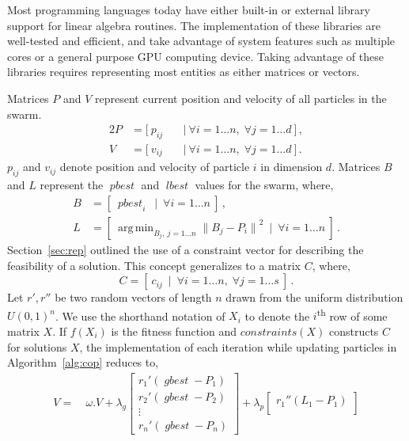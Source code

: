 \documentclass[10pt,draft]{article}
\newcommand{\tsup}{\textsuperscript}
\DeclareMathOperator*{\argmin}{arg\,min}
\DeclareMathOperator*{\pbest}{\mathit{pbest}}
\DeclareMathOperator*{\gbest}{\mathit{gbest}}
\DeclareMathOperator*{\lbest}{\mathit{lbest}}
\begin{document}
\begin{appendices}
  Most programming languages today have either built-in or external library support for linear algebra routines. The
  implementation of these libraries are well-tested and efficient, and take advantage of system features such as
  multiple cores or a general purpose GPU computing device. Taking advantage of these libraries requires representing
  most entities as either matrices or vectors. 

  Matrices $P$ and $V$ represent current position and velocity of all particles in the swarm.
  \begin{alignat}{2}
    P &= [\ p_{ij}\ &&\mid\ \forall i=1\dots n,\;\forall j=1\dots d\ ]\,,\\
    V &= [\ v_{ij}\ &&\mid\ \forall i=1\dots n,\;\forall j=1\dots d\ ]\,.
  \end{alignat}
  $p_{ij}$ and $v_{ij}$ denote position and velocity of particle $i$ in dimension $d$. Matrices $B$ and $L$ represent
  the $\pbest$ and $\lbest$ values for the swarm, where,
  \begin{align}
    B &= [\ {\pbest}_i\ \mid\ \forall i=1\dots n\ ]\,,\\
    L &= [\ \argmin_{B_j,\ j = 1\dots n} {\|B_j - P_i\|}^2\ \mid\ \forall i=1\dots n\ ]\,.
  \end{align}
  Section~\ref{sec:rep} outlined the use of a constraint vector for describing the feasibility of a solution. This
  concept generalizes to a matrix $C$, where,
  \begin{equation}
    C = [\ c_{ij}\ \mid\ \forall i=1\dots n,\;\forall j=1\dots s\ ]\,.
  \end{equation}
  Let $r',r''$ be two random vectors of length $n$ drawn from the uniform distribution ${U(0,1)}^n$. We use the
  shorthand notation of $X_i$ to denote the $i$\tsup{th} row of some matrix $X$. If $f(X_i)$ is the fitness function and
  $\mathit{constraints}(X)$ constructs $C$ for solutions $X$, the implementation of each iteration while updating
  particles in Algorithm~\ref{alg:cop} reduces to,
  \begin{align}
    V  =&\ \omega.V + \lambda_g\begin{bmatrix}
      {r_1}'(\gbest - P_1)\\
      {r_2}'(\gbest - P_2)\\
      \vdots\\
      {r_n}'(\gbest - P_n)
    \end{bmatrix} + \lambda_p\begin{bmatrix}
      {r_1}''(L_1 - P_1)\\

\end{bmatrix}
\end{align}
\end{appendices}
\end{document}
